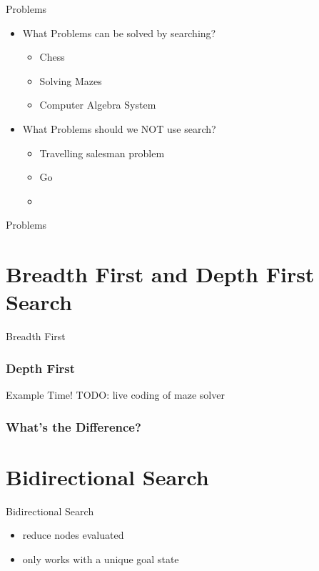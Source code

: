 \documentclass[presentation]{beamer}
\begin{document}
\begin{frame}{Problems}
  \begin{itemize}
  \item What Problems can be solved by searching?
    \begin{itemize}
    \item <1-> Chess
    \item <2-> Solving Mazes
    \item <3-> Computer Algebra System
    \end{itemize}
  \item What Problems should we NOT use search?
    \begin{itemize}
    \item <4-> Travelling salesman problem
    \item <5-> Go
    \item <6-> 
    \end{itemize}
  \end{itemize}
\end{frame}
\begin{frame}{Problems}
  
\end{frame}
\section{Breadth First and Depth First Search}
\begin{frame}{Breadth First}
\end{frame}
\begin{frame}
  \frametitle{Depth First}
  
\end{frame}
\begin{frame}{Example Time!}
  TODO: live coding of maze solver
\end{frame}
\begin{frame}
  \frametitle{What's the Difference?}
  
\end{frame}
\section{Bidirectional Search}
\begin{frame}{Bidirectional Search}
  \begin{itemize}
  \item reduce nodes evaluated
  \item only works with a unique goal state
  \end{itemize}
\end{frame}
\end{document}
